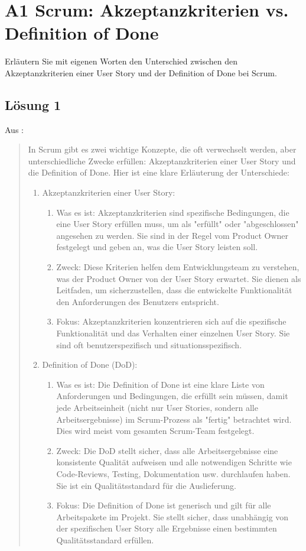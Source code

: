 \documentclass[main.tex]{subfiles}
\begin{document}
\section{A1 Scrum: Akzeptanzkriterien vs. Definition of Done}
Erläutern Sie mit eigenen Worten den Unterschied zwischen den Akzeptanzkriterien einer User Story und der Definition of Done bei Scrum.

\subsection{Lösung 1}

Aus \cite{openai2023chatgpt4}:
\begin{quote}

In Scrum gibt es zwei wichtige Konzepte, die oft verwechselt werden, aber unterschiedliche Zwecke erfüllen: Akzeptanzkriterien einer User Story und die Definition of Done. Hier ist eine klare Erläuterung der Unterschiede:


\renewcommand{\labelenumi}{\arabic{enumi}.}
\begin{enumerate}

\item Akzeptanzkriterien einer User Story:
\begin{enumerate}
   \item Was es ist: Akzeptanzkriterien sind spezifische Bedingungen, die eine User Story erfüllen muss, um als "erfüllt" oder "abgeschlossen" angesehen zu werden. Sie sind in der Regel vom Product Owner festgelegt und geben an, was die User Story leisten soll.
   \item Zweck: Diese Kriterien helfen dem Entwicklungsteam zu verstehen, was der Product Owner von der User Story erwartet. Sie dienen als Leitfaden, um sicherzustellen, dass die entwickelte Funktionalität den Anforderungen des Benutzers entspricht.
   \item Fokus: Akzeptanzkriterien konzentrieren sich auf die spezifische Funktionalität und das Verhalten einer einzelnen User Story. Sie sind oft benutzerspezifisch und situationsspezifisch.
\end{enumerate}
\item Definition of Done (DoD):
\begin{enumerate}
    \item Was es ist: Die Definition of Done ist eine klare Liste von Anforderungen und Bedingungen, die erfüllt sein müssen, damit jede Arbeitseinheit (nicht nur User Stories, sondern alle Arbeitsergebnisse) im Scrum-Prozess als "fertig" betrachtet wird. Dies wird meist vom gesamten Scrum-Team festgelegt.
    \item Zweck: Die DoD stellt sicher, dass alle Arbeitsergebnisse eine konsistente Qualität aufweisen und alle notwendigen Schritte wie Code-Reviews, Testing, Dokumentation usw. durchlaufen haben. Sie ist ein Qualitätsstandard für die Auslieferung.
    \item Fokus: Die Definition of Done ist generisch und gilt für alle Arbeitspakete im Projekt. Sie stellt sicher, dass unabhängig von der spezifischen User Story alle Ergebnisse einen bestimmten Qualitätsstandard erfüllen.
\end{enumerate}
\end{enumerate}


\end{quote}
\end{document}
